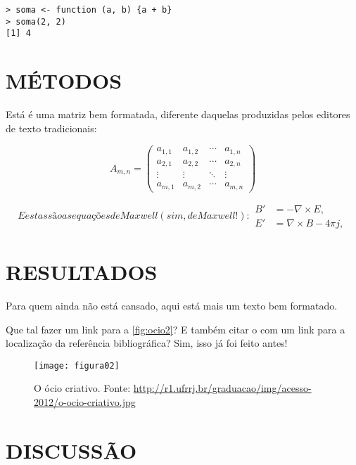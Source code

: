 \begin{verbatim}
> soma <- function (a, b) {a + b}
> soma(2, 2)
[1] 4
\end{verbatim}

\section{MÉTODOS}

Está é uma matriz bem formatada, diferente daquelas produzidas pelos editores de
texto tradicionais:

\begin{equation}
  A_{m,n} =
 \begin{pmatrix}
  a_{1,1} & a_{1,2} & \cdots & a_{1,n} \\
  a_{2,1} & a_{2,2} & \cdots & a_{2,n} \\
  \vdots  & \vdots  & \ddots & \vdots  \\
  a_{m,1} & a_{m,2} & \cdots & a_{m,n}
 \end{pmatrix}
\end{equation}

\begin{subequations}\label{eq:maxwell2}
E estas são as equações de Maxwell (sim, de Maxwell!):
\begin{align}
        B'&=-\nabla \times E,\\
        E'&=\nabla \times B - 4\pi j,
\end{align}
\end{subequations}

\section{RESULTADOS}

Para quem ainda não está cansado, aqui está mais um texto bem formatado. 
\blindtext[1]

Que tal fazer um link para a \autoref{fig:ocio2}? E também citar o 
 com um link para a localização da referência 
bibliográfica? Sim, isso já foi feito antes!

\begin{figure}[!ht]
\label{fig:ocio2}
\centering
\texttt{[image: figura02]}
\caption[O ócio criativo.]{O ócio criativo. Fonte: 
\url{http://r1.ufrrj.br/graduacao/img/acesso-2012/o-ocio-criativo.jpg}}
\end{figure}

\section{DISCUSSÃO}

